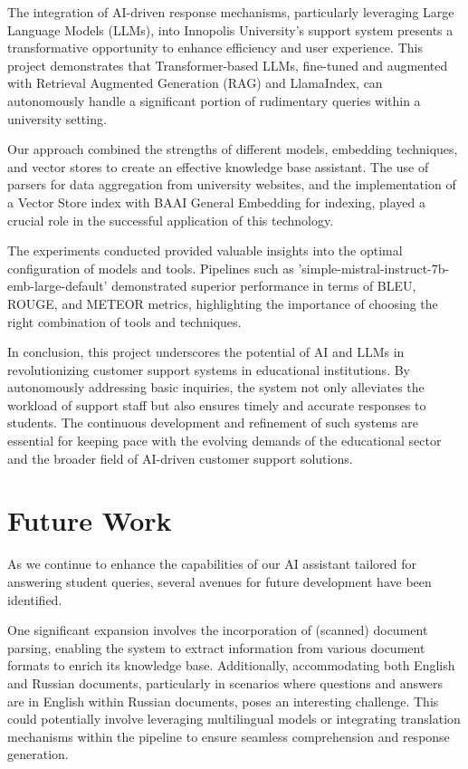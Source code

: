 \documentclass[conference, 11pt]{IEEEtran}
\begin{document}
The integration of AI-driven response mechanisms, particularly leveraging Large Language Models (LLMs), into Innopolis University's support system presents a transformative opportunity to enhance efficiency and user experience. This project demonstrates that Transformer-based LLMs, fine-tuned and augmented with Retrieval Augmented Generation (RAG) and LlamaIndex, can autonomously handle a significant portion of rudimentary queries within a university setting.

Our approach combined the strengths of different models, embedding techniques, and vector stores to create an effective knowledge base assistant. The use of parsers for data aggregation from university websites, and the implementation of a Vector Store index with BAAI General Embedding for indexing, played a crucial role in the successful application of this technology.

The experiments conducted provided valuable insights into the optimal configuration of models and tools. Pipelines such as 'simple-mistral-instruct-7b-emb-large-default' demonstrated superior performance in terms of BLEU, ROUGE, and METEOR metrics, highlighting the importance of choosing the right combination of tools and techniques.

In conclusion, this project underscores the potential of AI and LLMs in revolutionizing customer support systems in educational institutions. By autonomously addressing basic inquiries, the system not only alleviates the workload of support staff but also ensures timely and accurate responses to students. The continuous development and refinement of such systems are essential for keeping pace with the evolving demands of the educational sector and the broader field of AI-driven customer support solutions.

\section{Future Work}

As we continue to enhance the capabilities of our AI assistant tailored for answering student queries, several avenues for future development have been identified. 

One significant expansion involves the incorporation of (scanned) document parsing, enabling the system to extract information from various document formats to enrich its knowledge base. Additionally, accommodating both English and Russian documents, particularly in scenarios where questions and answers are in English within Russian documents, poses an interesting challenge. This could potentially involve leveraging multilingual models or integrating translation mechanisms within the pipeline to ensure seamless comprehension and response generation. 
\end{document}
